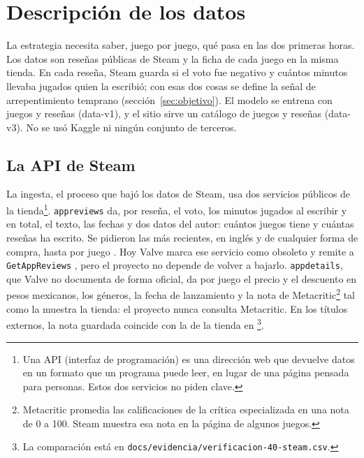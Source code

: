 \section{Descripción de los datos}\label{sec:datos}

La estrategia necesita saber, juego por juego, qué pasa en las dos primeras horas. Los datos son
reseñas públicas de Steam y la ficha de cada juego en la misma tienda. En cada
reseña, Steam guarda si el voto fue negativo y cuántos minutos llevaba jugados quien la escribió;
con esas dos cosas se define la señal de arrepentimiento temprano (sección~\ref{sec:objetivo}). El
modelo se entrena con \cifraJuegosEntrenamiento{} juegos y \cifraResenasEntrenamiento{} reseñas
(data-v1), y el sitio sirve un catálogo de \cifraJuegosCatalogo{} juegos y
\cifraResenasCatalogo{} reseñas (data-v3). No se usó Kaggle ni ningún conjunto de terceros.

\subsection{La API de Steam}\label{sec:datos-api}

La ingesta, el proceso que bajó los datos de Steam, usa dos servicios públicos de la
tienda\footnote{Una API (interfaz de programación) es una dirección web que devuelve datos en un
formato que un programa puede leer, en lugar de una página pensada para personas. Estos dos
servicios no piden clave.}. \texttt{appreviews} da, por reseña, el voto, los minutos jugados al
escribir y en total, el texto, las fechas y dos datos del autor: cuántos juegos tiene y cuántas
reseñas ha escrito. Se pidieron las más recientes, en inglés y de cualquier forma de compra, hasta
\cifraTopeIngesta{} por juego \parencite{valve_getreviews}. Hoy Valve marca ese servicio como
obsoleto y remite a \texttt{GetAppReviews} \parencite{valve_iuserreviews}, pero el proyecto no
depende de volver a bajarlo. \texttt{appdetails}, que Valve no documenta de forma oficial, da por
juego el precio y el descuento en pesos mexicanos, los géneros, la fecha de lanzamiento y la nota
de Metacritic\footnote{Metacritic promedia las calificaciones de la crítica especializada en una
nota de 0 a 100. Steam muestra esa nota en la página de algunos juegos.} tal como la muestra la
tienda: el proyecto nunca consulta Metacritic. En los \cifraJuegosExternos{} títulos externos, la
nota guardada coincide con la de la tienda en \cifraMetacriticVerificadoExternos{}\footnote{La
comparación está en \texttt{docs/evidencia/verificacion-40-steam.csv}.}.

